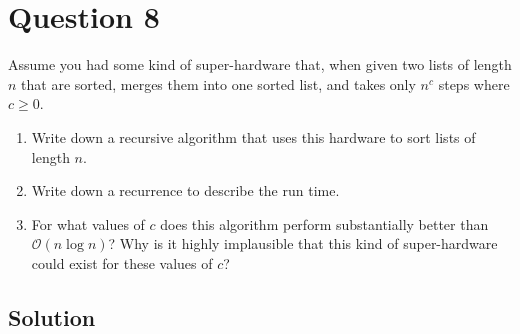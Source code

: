 
\section*{Question 8}

Assume you had some kind of super-hardware that, when given two lists of length $n$ that are sorted, merges them into one sorted list, and takes only $n^c$ steps where $c \geq 0$.

\begin{enumerate}[label=(\alph*)]
\item Write down a recursive algorithm that uses this hardware to sort lists of length $n$.
\item Write down a recurrence to describe the run time.
\item For what values of $c$ does this algorithm perform substantially better than $\mathcal{O}(n \log n)$? Why is it highly implausible that this kind of super-hardware could exist for these values of $c$?
\end{enumerate}

\subsection*{Solution}

